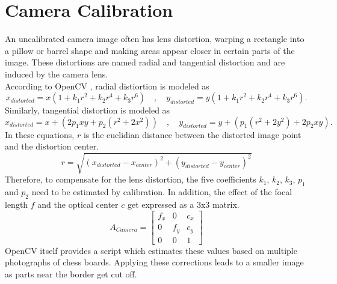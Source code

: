 \section{Camera Calibration}
\label{sec:FundCamCalibration}
An uncalibrated camera image often has lens distortion, warping a rectangle into a pillow or barrel shape and making areas appear closer in certain parts of the image. These distortions are named radial and tangential distortion and are induced by the camera lens.\\
According to OpenCV \cite{openCVCamCalib}, radial distiortion is modeled as
\begin{equation*}
x_{distorted} = x(1+k_{1}r^{2}+k_{2}r^{4}+k_{3}r^{6})\quad,\quad
y_{distorted} = y(1+k_{1}r^{2}+k_{2}r^{4}+k_{3}r^{6}).
\end{equation*}
Similarly, tangential distortion is modeled as
\begin{equation*}
    x_{distorted} = x+(2p_{1}xy+p_{2}(r^{2}+2x^{2}))\quad,\quad
    y_{distorted} = y+(p_{1}(r^{2}+2y^{2})+2p_{2}xy).
\end{equation*}
In these equations, $r$ is the euclidian distance between the distorted image point and the distortion center.\\
\begin{equation*}
    r=\sqrt{(x_{distorted}-x_{center})^{2}+(y_{distorted}-y_{center})^{2}}
\end{equation*}
Therefore, to compensate for the lens distortion, the five coefficients $k_{1}$, $k_{2}$, $k_{3}$, $p_{1}$ and $p_{2}$ need to be estimated by calibration. In addition, the effect of the focal length $f$ and the optical center $c$ get expressed as a 3x3 matrix.
\begin{equation*}
    A_{Camera}=
    \begin{bmatrix}
        f_{x} & 0 & c_{x} \\
        0 & f_{y} & c_{y} \\
        0 & 0 & 1
    \end{bmatrix}
\end{equation*}
OpenCV itself provides a script which estimates these values based on multiple photographs of chess boards. Applying these corrections leads to a smaller image as parts near the border get cut off.
